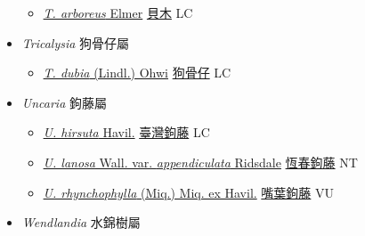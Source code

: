 \begin{itemize}
  \begin{itemize}
        \item[] \href{http://www.theplantlist.org/tpl1.1/search?q=Timonius+arboreus}{\textit{T. arboreus} Elmer}   \href{\detokenize{http://taibnet.sinica.edu.tw/chi/taibnet_species_list.php?T2=貝木&T2_new_value=true&fr=y}}{貝木} LC
  \end{itemize}
 \item[] \textit{Tricalysia} 狗骨仔屬
                    
  \begin{itemize}
        \item[] \href{http://www.theplantlist.org/tpl1.1/search?q=Tricalysia+dubia}{\textit{T. dubia} (Lindl.) Ohwi}   \href{\detokenize{http://taibnet.sinica.edu.tw/chi/taibnet_species_list.php?T2=狗骨仔&T2_new_value=true&fr=y}}{狗骨仔} LC
  \end{itemize}
 \item[] \textit{Uncaria} 鉤藤屬
                    
  \begin{itemize}
        \item[] \href{http://www.theplantlist.org/tpl1.1/search?q=Uncaria+hirsuta}{\textit{U. hirsuta} Havil.}   \href{\detokenize{http://taibnet.sinica.edu.tw/chi/taibnet_species_list.php?T2=臺灣鉤藤&T2_new_value=true&fr=y}}{臺灣鉤藤} LC
        \item[] \href{http://www.theplantlist.org/tpl1.1/search?q=Uncaria+lanosa+var.+appendiculata}{\textit{U. lanosa} Wall. var. \textit{appendiculata} Ridsdale}   \href{\detokenize{http://taibnet.sinica.edu.tw/chi/taibnet_species_list.php?T2=恆春鉤藤&T2_new_value=true&fr=y}}{恆春鉤藤} NT
        \item[] \href{http://www.theplantlist.org/tpl1.1/search?q=Uncaria+rhynchophylla}{\textit{U. rhynchophylla} (Miq.) Miq. ex Havil.}   \href{\detokenize{http://taibnet.sinica.edu.tw/chi/taibnet_species_list.php?T2=嘴葉鉤藤&T2_new_value=true&fr=y}}{嘴葉鉤藤} VU
  \end{itemize}
 \item[] \textit{Wendlandia} 水錦樹屬
                    

\end{itemize}
